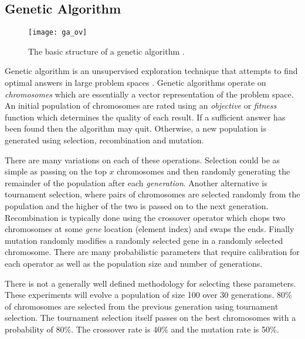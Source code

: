 \subsection{Genetic Algorithm}
\begin{figure}[h]
\centering
\texttt{[image: ga\_ov]}
\caption{The basic structure of a genetic algorithm \cite{geatbx}.}
\label{f:ga_ov}
\end{figure}

	Genetic algorithm is an unsupervised exploration technique that attempts to find optimal answers in large problem spaces \cite{geatbx}. 
	Genetic algorithms operate on \emph{chromosomes} which are essentially a vector representation of the problem space.
	An initial population of chromosomes are rated using an \emph{objective} or \emph{fitness} function which determines the quality of each result. 
	If a sufficient answer has been found then the algorithm may quit.
	Otherwise, a new population is generated using selection, recombination and mutation. 
	
	There are many variations on each of these operations. Selection could be as simple as passing on the top $x$ chromosomes and then randomly generating the remainder of the population after each \emph{generation}. 
	Another alternative is tournament selection, where pairs of chromosomes are selected randomly from the population and the higher of the two is passed on to the next generation. 
	Recombination is typically done using the crossover operator which chops two chromosomes at some \emph{gene} location (element index) and swaps the ends.
	Finally mutation randomly modifies a randomly selected gene in a randomly selected chromosome.
	There are many probabilistic parameters that require calibration for each operator as well as the population size and number of generations.
	
	There is not a generally well defined methodology for selecting these parameters. These experiments will evolve a population of size 100 over 30 generations. 80\% of chromosomes are selected from the previous generation using tournament selection. The tournament selection itself passes on the best chromosomes with a probability of 80\%. The crossover rate is 40\% and the mutation rate is 50\%.

